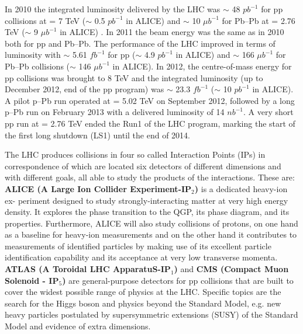 In 2010 the integrated luminosity delivered by the LHC was $\sim$ 48 $pb^{-1}$ for pp collisions at \s = 7 TeV ($\sim$ 0.5 $pb^{-1}$ in ALICE) and $\sim$ 10 $\mu b^{-1}$ for Pb--Pb at \snn = 2.76 TeV ($\sim$ 9 $\mu b^{-1}$ in ALICE) \cite{cite:ALICEPerformance}. In 2011 the beam energy was the same as in 2010 both for pp and Pb--Pb. The performance of the LHC improved in terms of luminosity with $\sim$ 5.61 $fb^{-1}$ for pp ($\sim$ 4.9 $pb^{-1}$ in ALICE) and $\sim$ 166 $\mu b^{-1}$ for Pb--Pb collisions ($\sim$ 146 $\mu b^{-1}$ in ALICE). In 2012, the centre-of-mass energy for pp collisions was brought to 8 TeV and the integrated luminosity (up to December 2012, end of the pp program) was $\sim$ 23.3 $fb^{-1}$ ($\sim$ 10 $pb^{-1}$ in ALICE). A pilot p--Pb run operated at \snn = 5.02 TeV on September 2012, followed by a long p--Pb run on February 2013 with a delivered luminosity of 14 $nb^{-1}$. A very short pp run at \s = 2.76 TeV ended the Run1 of the LHC program, marking the start of the first long shutdown (LS1) until the end of 2014. %

The LHC produces collisions in four so called Interaction Points (IPs) in correspondence of which are located six detectors of different dimensions and with different goals, all able to study the products of the interactions. These are: \\

\textbf{ALICE (A Large Ion Collider Experiment-IP$_{2}$)} \cite{cite:proposalALICE} is a dedicated heavy-ion ex- periment designed to study strongly-interacting matter at very high energy density. It explores the phase transition to the QGP, its phase diagram, and its properties. Furthermore, ALICE will also study collisions of protons, on one hand as a baseline for heavy-ion measurements and on the other hand it contributes to measurements of identified particles by making use of its excellent particle identification capability and its acceptance at very low transverse momenta. \\

\textbf{ATLAS (A Toroidal LHC ApparatuS-IP$_{1}$)} and \textbf{CMS (Compact Muon Solenoid - IP$_{5}$) }\cite{cite:proposalATLAS}\cite{cite:proposalCMS} are general-purpose detectors for pp collisions that are built to cover the widest possible range of physics at the LHC. Specific topics are the search for the Higgs boson and physics beyond the Standard Model, e.g. new heavy particles postulated by supersymmetric extensions (SUSY) of the Standard Model and evidence of extra dimensions.\\


